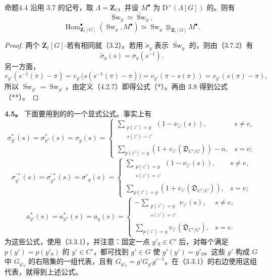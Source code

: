 \begin{SGAresult}{命题}{4.4}
沿用 3.7 的记号，取 $\Lambda=\mathbf Z_\ell$，并设 $M^\bullet$ 为 $\mathrm D^+(\Lambda[G])$ 的。则有
\[
\operatorname{Sw}_y\simeq\check{\operatorname{Sw}}_y,\tag{*}
\]
\[
\operatorname{Hom}_{\mathbf Z_\ell[G]}^\bullet(\operatorname{Sw}_y,M^\bullet)
\simeq\operatorname{Sw}_y\otimes_{\mathbf Z_\ell[G]}M^\bullet.\tag{**}
\]
\end{SGAresult}
\begin{proof}
两个 $\mathbf Z_\ell[G]$-若有相同就（3.2）。若用 $\check\sigma_y$ 表示 $\check{\operatorname{Sw}}_y$ 的，则由（3.7.2）有
\[
\check\sigma_y(s)=\sigma_y(s^{-1}).
\]
另一方面，
\[
v_{y'}(s^{-1}(\pi)-\pi)
=v_{y'}\bigl(s(s^{-1}(\pi)-\pi)\bigr)
=v_{y'}(\pi-s(\pi))=v_{y'}(s(\pi)-\pi),
\]
所以 $\check{\operatorname{Sw}}_{y'}=\operatorname{Sw}_{y'}$，由定义（4.2.7）即得公式（*）。再由 3.8 得到公式（**）。
\end{proof}

\textbf{4.5。} 下面要用到的的一个显式公式。事实上有
\[
\sigma_{y'}^*(s)=\sigma_{y''}^*(s)=\sigma_y(s)=
\begin{cases}
\displaystyle\sum_{\substack{p(z')=y\\s(z')=z'}}(1-\nu_{z'}(s)),&s\ne e,\\
\displaystyle\sum_{p(z')=y}(1+v_{z'}(\mathfrak D_{C'/C}))-n,&s=e;
\end{cases}\tag{4.5.1}
\]
\[
\sigma_{y'}^{\prime *}(s)=\sigma_{y''}^{\prime *}(s)=\sigma'_y(s)=
\begin{cases}
\displaystyle\sum_{\substack{p(z')=y\\s(z')=z'}}(1-\nu_{z'}(s)),&s\ne e,\\
\displaystyle\sum_{p(z')=y}(1+v_{z'}(\mathfrak D_{C'/C})),&s=e;
\end{cases}\tag{4.5.2}
\]
\[
a_{y'}^*(s)=a_{y''}^*(s)=a_y(s)=
\begin{cases}
\displaystyle-\sum_{\substack{p(z')=y\\s(z')=z'}}\nu_{z'}(s),&s\ne e,\\
\displaystyle\sum_{p(z')=y}v_{z'}(\mathfrak D_{C'/C}),&s=e.
\end{cases}\tag{4.5.3}
\]
为这些公式，使用（3.3.1），并注意：固定一点 $y'_0\in C'$ 后，对每个满足 $p(y')=p(y'_0)$ 的 $y'\in C'$，都可找到 $g'\in G$ 使 $g'(y')=y'_0$。这些 $g'$ 构成 $G$ 中 $G_{y'_0}$ 的右陪集的一组代表，且有 $G_{y'_0}=g'G_{y'}g'^{-1}$。在（3.3.1）的右边使用这组代表，就得到上述公式。

